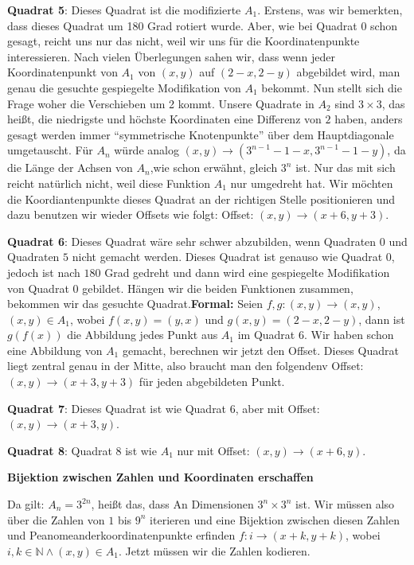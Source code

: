 \documentclass[course=erap]{aspdoc}
\begin{document}
\large\textbf{Quadrat 5}: Dieses Quadrat ist die modifizierte $A_1$. Erstens, was wir bemerkten, dass dieses Quadrat um 180 Grad rotiert wurde. Aber, wie bei Quadrat $0$ schon gesagt, reicht uns nur das nicht, weil wir uns für die Koordinatenpunkte interessieren. Nach vielen Überlegungen sahen wir, dass wenn jeder Koordinatenpunkt von $A_1$ von $(x,y)$ auf $(2-x,2-y)$ abgebildet wird, man genau die gesuchte gespiegelte Modifikation von $A_1$ bekommt. Nun stellt sich die Frage woher die Verschieben um 2 kommt. Unsere Quadrate in $A_2$ sind $3\times3$, das heißt,  die niedrigste und höchste Koordinaten eine Differenz von $2$ haben, anders gesagt werden immer “symmetrische Knotenpunkte” über dem Hauptdiagonale umgetauscht.  Für $A_n$ würde analog $(x,y)\to(3^{n-1}-1-x,3^{n-1}-1-y)$, da die Länge der Achsen von $A_n$,wie schon erwähnt, gleich $3^n$ ist. Nur das mit sich reicht natürlich nicht, weil diese Funktion $A_1$ nur umgedreht hat. Wir möchten die Koordiantenpunkte dieses Quadrat an der richtigen Stelle positionieren und dazu benutzen wir wieder Offsets wie folgt:  Offset: $(x,y) \to (x+6,y+3)$.\newline


\large\textbf{Quadrat 6}: Dieses Quadrat wäre sehr schwer abzubilden, wenn Quadraten $0$ und Quadraten $5$ nicht gemacht werden. Dieses Quadrat ist genauso wie Quadrat 0, jedoch ist nach $180$ Grad gedreht und dann wird eine gespiegelte Modifikation von Quadrat 0 gebildet. Hängen wir die beiden Funktionen zusammen, bekommen wir das gesuchte Quadrat.\textbf{Formal:} Seien $f,g : (x,y) \to (x,y)$, $(x,y)\in{A_1}$, wobei $f(x,y) = (y,x)$ und $g(x,y) = (2-x,2-y)$, dann ist $g(f(x))$ die Abbildung jedes Punkt aus $A_1$ im Quadrat 6. Wir haben schon eine Abbildung von $A_1$ gemacht, berechnen wir jetzt den Offset. Dieses Quadrat liegt zentral genau in der Mitte, also braucht man den folgendenv Offset: $(x,y) \to (x+3,y+3)$ für jeden abgebildeten Punkt.\newline


\large\textbf{Quadrat 7}: Dieses Quadrat ist wie Quadrat 6, aber mit Offset: $(x,y) \to (x+3,y)$.\newline

\large\textbf{Quadrat 8}: Quadrat 8 ist wie $A_1$ nur mit Offset: $(x,y) \to (x+6,y)$.\newline

\large\textbf{ Bijektion zwischen Zahlen und Koordinaten erschaffen}\newline

Da gilt: $A_n=3^{2n}$, heißt das, dass An Dimensionen $3^n \times 3^n$ ist.
Wir müssen also über die Zahlen von $1$ bis $9^n$ iterieren und eine Bijektion zwischen diesen Zahlen und Peanomeanderkoordinatenpunkte erfinden $f: i \to (x+k,y+k)$, wobei $i,k \in \mathbb{N} \wedge (x,y) \in A_1$. Jetzt müssen wir die Zahlen kodieren.\newline
\end{document}
